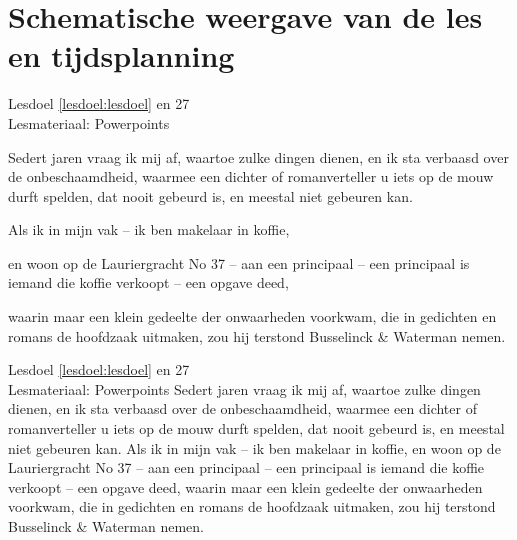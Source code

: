
\section{Schematische weergave van de les en tijdsplanning}
\lesschematitel
\helplesdeel

\begin{lesdeel}{
    Lesdoel \ref{lesdoel:lesdoel} en 27 \\
    Lesmateriaal: Powerpoints
}
    \vspace{-3.5mm}
    \begin{schemalist}
        \item{Sedert jaren vraag ik mij af, waartoe zulke dingen dienen, en ik sta verbaasd over de onbeschaamdheid, waarmee een dichter of romanverteller u iets op de mouw durft spelden, dat nooit gebeurd is, en meestal niet gebeuren kan.}
        \item{Als ik in mijn vak -- ik ben makelaar in koffie, }
        \item{en woon op de Lauriergracht No 37 -- aan een principaal -- een principaal is iemand die koffie verkoopt -- een opgave deed, }
        \item{waarin maar een klein gedeelte der onwaarheden voorkwam, die in gedichten en romans de hoofdzaak uitmaken, zou hij terstond Busselinck \& Waterman nemen.}
    \end{schemalist}
\end{lesdeel}%


\begin{lesdeel}{
    Lesdoel \ref{lesdoel:lesdoel}  en 27 \\
    Lesmateriaal: Powerpoints
}
    Sedert jaren vraag ik mij af, waartoe zulke dingen dienen, en ik sta verbaasd over de onbeschaamdheid, waarmee een dichter of romanverteller u iets op de mouw durft spelden, dat nooit gebeurd is, en meestal niet gebeuren kan.
    Als ik in mijn vak -- ik ben makelaar in koffie, en woon op de Lauriergracht No 37 -- aan een principaal -- een principaal is iemand die koffie verkoopt -- een opgave deed, waarin maar een klein gedeelte der onwaarheden voorkwam, die in gedichten en romans de hoofdzaak uitmaken, zou hij terstond Busselinck \& Waterman nemen.
\end{lesdeel}%

